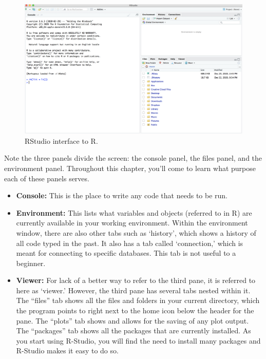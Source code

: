 \documentclass[]{book}
\begin{document}
\begin{figure}

{\centering \includegraphics[width=1\linewidth]{figures/Rconsole1} 

}

\caption{RStudio interface to R.}\label{fig:Rconsole1}
\end{figure}

Note the three panels divide the screen: the console panel, the files
panel, and the environment panel. Throughout this chapter, you'll come
to learn what purpose each of these panels serves.

\begin{itemize}
\item
  \textbf{Console:} This is the place to write any code that needs to be
  run.
\item
  \textbf{Environment:} This lists what variables and objects (referred
  to in R) are currently available in your working environment. Within
  the environment window, there are also other tabs such as `history',
  which shows a history of all code typed in the past. It also has a tab
  called `connection,' which is meant for connecting to specific
  databases. This tab is not useful to a beginner.
\item
  \textbf{Viewer:} For lack of a better way to refer to the third pane,
  it is referred to here as `viewer.' However, the third pane has
  several tabs nested within it. The ``files'' tab shows all the files
  and folders in your current directory, which the program points to
  right next to the home icon below the header for the pane. The
  ``plots'' tab shows and allows for the saving of any plot output. The
  ``packages'' tab shows all the packages that are currently installed.
  As you start using R-Studio, you will find the need to install many
  packages and R-Studio makes it easy to do so.
\end{itemize}
\end{document}
